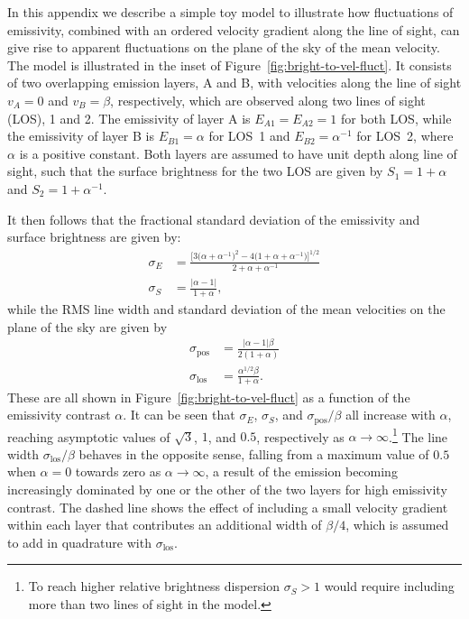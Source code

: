 \documentclass[fleqn,usenatbib, useAMS, a4paper]{mnras}
\newcommand\pos{\ensuremath{_{\mathrm{pos}}}}
\newcommand\los{\ensuremath{_{\mathrm{los}}}}
\begin{document}
In this appendix we describe a simple toy model to illustrate
how fluctuations of emissivity,
combined with an ordered velocity gradient along the line of sight,
can give rise to apparent fluctuations on the plane of the sky
of the mean velocity.
The model is illustrated in the inset of Figure~\ref{fig:bright-to-vel-fluct}.
It consists of two overlapping emission layers, A and B,
with velocities along the line of sight \(v_A = 0\) and \(v_B = \beta\), respectively,
which are observed along two lines of sight (LOS), 1 and 2.
The emissivity of layer A is \(E_{A1} = E_{A2} = 1\) for both LOS,
while the emissivity of layer B is \(E_{B1} = \alpha\) for LOS~1
and \(E_{B2} = \alpha^{-1}\) for LOS~2, where \(\alpha\) is a positive constant.
Both layers are assumed to have unit depth along line of sight,
such that the surface brightness for the two LOS are given by
\(S_1 = 1 + \alpha\) and \(S_2 = 1 + \alpha^{-1}\).


It then follows that the fractional standard deviation of the emissivity
and surface brightness are given by:
\begin{align}
  \label{eq:toy}
  \sigma_E &=
  \frac{
    \bigl[ 3\bigl(\alpha + \alpha^{-1}\bigr)^2 - 4\bigl(1 + \alpha + \alpha^{-1}\bigr)\bigr]^{1/2}
  }{
    2 + \alpha + \alpha^{-1}
  }
  \\
  \sigma_S &=   \frac{\vert\alpha - 1\vert}{1 + \alpha} ,
\end{align}
while the RMS line width and standard deviation of the mean velocities on the plane of the sky
are given by
\begin{align}
  \label{eq:toy}
  \sigma\pos &=\frac{\vert\alpha - 1\vert \beta}{2 (1 + \alpha)}
  \\
  \sigma\los &=   \frac{\alpha^{1/2}\beta}{1 + \alpha}.
\end{align}
These are all shown in Figure~\ref{fig:bright-to-vel-fluct} as a function
of the emissivity contrast \(\alpha\).
It can be seen that \(\sigma_E\), \(\sigma_S\), and \(\sigma\pos/\beta\) all increase with \(\alpha\),
reaching asymptotic values of \(\sqrt{3}\), \(1\), and \(0.5\),
respectively as \(\alpha \to \infty\).\footnote{%
  To reach higher relative brightness dispersion \(\sigma_S > 1\) would require
  including more than two lines of sight in the model.
}
The line width \(\sigma\los/\beta\) behaves in the opposite sense, falling from
a maximum value of \(0.5\) when \(\alpha = 0\) towards zero as \(\alpha \to \infty\),
a result of the emission becoming increasingly dominated by one
or the other of the two layers for high emissivity contrast.
The dashed line shows the effect of including a small velocity gradient
within each layer that contributes an additional width of \(\beta/4\),
which is assumed to add in quadrature with \(\sigma\los\).
\end{document}
